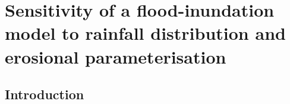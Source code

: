 \chapter{Sensitivity of a flood-inundation model to rainfall distribution and erosional parameterisation}
\label{chapter_flood_model_sensitivity}

%
%
\section{Introduction}



